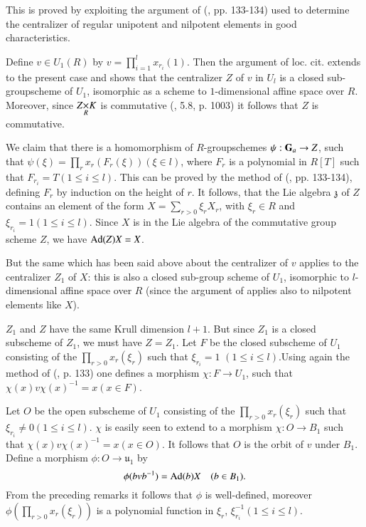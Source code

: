 This is proved by exploiting the argument of (\cite{art19-key14}, pp. 133-134) used to determine the centralizer of regular unipotent and nilpotent elements in good characteristics.

Define $v\in U_{1}(R)$ by $v=\prod\limits^{l}_{i=1}x_{r_{i}}(1)$. Then the argument of loc. cit. extends to the present case and shows that the centralizer $Z$ of $v$ in $U_{l}$ is a closed sub-groupscheme of $U_{1}$, isomorphic as a scheme to $1$-dimensional affine space over $R$. Moreover, since $\fprod{Z}{K}{R}$ is commutative (\cite{art19-key8}, 5.8, p. 1003) it follows that $Z$ is commutative.

We claim that there is a homomorphism of $R$-groupschemes $\psi:\mathbf{G}_{a}\to Z$, such that $\psi(\xi)=\prod\limits_{r}x_{r}(F_{r}(\xi))(\xi\in l)$, where $F_{r}$ is a polynomial in $R[T]$ such that $F_{r_{i}}=T(1\leq i\leq l)$. This can be proved by the method of (\cite{art19-key14}, pp. 133-134), defining $F_{r}$ by induction on the height of $r$. It follows, that the Lie algebra $\mathfrak{z}$ of $Z$ contains an element of the form $X=\sum\limits_{r>0}\xi_{r}X_{r}$, with $\xi_{r}\in R$ and $\xi_{r_{i}}=1(1\leq i\leq l)$. Since $X$ is in the Lie algebra of the commutative group scheme $Z$, we have $\operatorname{\mathrm{Ad}}(Z)X=X$.

But the same which has been said above about the centralizer of $v$ applies to the centralizer $Z_{1}$ of $X$: this is also a closed sub-group scheme of $U_{1}$, isomorphic to $l$-dimensional affine space over $R$ (since the argument of \cite{art19-key14} applies also to nilpotent elements like $X$).

$Z_{1}$ and $Z$ have the same Krull dimension $l+1$. But since $Z_{1}$ is a closed subscheme of $Z_{1}$, we must have $Z=Z_{1}$. Let $F$ be the closed subscheme of $U_{1}$ consisting of the $\prod\limits_{r>0}x_{r}(\xi_{r})$ such that $\xi_{r_{i}}=1$ $(1\leq i\leq l)$.\pageoriginale Using again the method of (\cite{art19-key14}, p. 133) one defines a morphism $\chi : F\to U_{1}$, such that $\chi(x)v\chi(x)^{-1}=x(x\in F)$.

Let $O$ be the open subscheme of $U_{1}$ consisting of the $\prod\limits_{r>0}x_{r}(\xi_{r})$ such that $\xi_{r_{i}}\neq 0(1\leq i\leq l)$. $\chi$ is easily seen to extend to a morphism $\chi : O\to B_{1}$ such that $\chi(x)v\chi(x)^{-1}=x(x\in O)$. It follows that $O$ is the orbit of $v$ under $B_{1}$. Define a morphism $\phi:O\to \mathfrak{u}_{1}$ by
\begin{equation}
\phi(bvb^{-1})=\operatorname{\mathrm{Ad}} (b)X\quad (b\in B_{1}).\label{art19-eq2}
\end{equation}
From the preceding remarks it follows that $\phi$ is well-defined, moreover $\phi(\prod\limits_{r>0}x_{r}(\xi_{r}))$ is a polynomial function in $\xi_{r}$, $\xi^{-1}_{r_{i}}(1\leq i\leq l)$.

